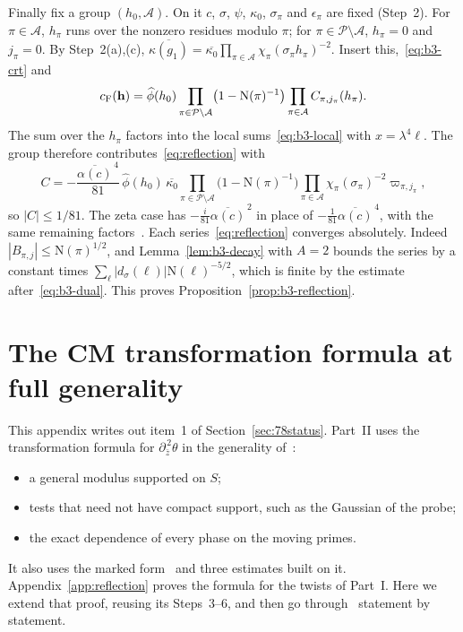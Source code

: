 \documentclass[11pt]{article}
\numberwithin{equation}{section}
\newcommand{\N}{\mathrm N}
\begin{document}
Finally fix a group $(h_0,\mathcal A)$. On it $c$, $\sigma$, $\psi$,
$\kappa_0$, $\sigma_\pi$ and $\epsilon_\pi$ are fixed (Step~2). For
$\pi\in\mathcal A$, $h_\pi$ runs over the nonzero residues modulo $\pi$;
for $\pi\in\mathcal P\setminus\mathcal A$, $h_\pi=0$ and $j_\pi=0$. By
Step~2(a),(c),
$\overline{\kappa(g_1)}=\overline{\kappa_0}\prod_{\pi\in\mathcal A}
\chi_\pi(\sigma_\pi h_\pi)^{-2}$. Insert this,~\eqref{eq:b3-crt} and
\begin{equation}\label{eq:d120}
 c_{\rm F}(\mathbf h)=\widehat\phi(h_0)\prod_{\pi\in\mathcal P\setminus
 \mathcal A}\bigl(1-\N(\pi)^{-1}\bigr)\prod_{\pi\in\mathcal A}
 C_{\pi,j_\pi}(h_\pi).
\end{equation}
The sum over the $h_\pi$ factors into the local sums~\eqref{eq:b3-local}
with $x=\lambda^4\ell$. The group therefore contributes~\eqref{eq:reflection}
with
\begin{equation}\label{eq:b3-C}
 C=-\frac{\overline{\alpha(c)}^{\,4}}{81}\,\widehat\phi(h_0)\,
 \overline{\kappa_0}\prod_{\pi\in\mathcal P\setminus\mathcal A}
 \bigl(1-\N(\pi)^{-1}\bigr)\prod_{\pi\in\mathcal A}
 \chi_\pi(\sigma_\pi)^{-2}\varpi_{\pi,j_\pi},
\end{equation}
so $|C|\le1/81$. The zeta case has $-\frac i{81}\overline{\alpha(c)}^{\,2}$
in place of $-\frac1{81}\overline{\alpha(c)}^{\,4}$, with the same
remaining factors~\cite[App.~A.2]{OAI1112}. Each
series~\eqref{eq:reflection} converges absolutely. Indeed
$|B_{\pi,j}|\le\N(\pi)^{1/2}$, and Lemma~\ref{lem:b3-decay} with $A=2$
bounds the series by a constant times
$\sum_\ell|d_\sigma(\ell)|\N(\ell)^{-5/2}$, which is finite by the
estimate after~\eqref{eq:b3-dual}. This proves
Proposition~\ref{prop:b3-reflection}.


\section{The CM transformation formula at full generality}\label{app:s1-general}

This appendix writes out item~1 of Section~\ref{sec:78status}. Part~II uses the transformation formula for
$\partial_{\bar z}^{\,2}\theta$ in the generality of~\cite[Prop.~5.1]{OAI78}:
\begin{itemize}
\item a general modulus supported on $S$;
\item tests that need not have compact support, such as the Gaussian of the probe;
\item the exact dependence of every phase on the moving primes.
\end{itemize}
It also uses the marked form~\cite[Cor.~14.1]{OAI78} and three estimates built on it.
Appendix~\ref{app:reflection} proves the formula for the twists of Part~I. Here we extend that proof, reusing its
Steps~3--6, and then go through~\cite[Sections~5 and~14--15]{OAI78} statement by statement.
\end{document}
